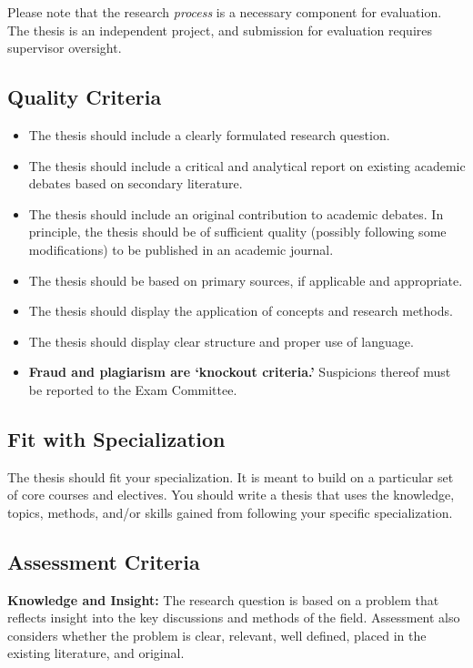 \documentclass[11pt,a4paper]{article}
\begin{document}
Please note that the research \textit{process} is a necessary component for evaluation. The thesis is an independent project, and submission for evaluation requires supervisor oversight.

\subsection{Quality Criteria}

\begin{itemize}
    \item The thesis should include a clearly formulated research question.
    \item The thesis should include a critical and analytical report on existing academic debates based on secondary literature.
    \item The thesis should include an original contribution to academic debates. In principle, the thesis should be of sufficient quality (possibly following some modifications) to be published in an academic journal.
    \item The thesis should be based on primary sources, if applicable and appropriate.
    \item The thesis should display the application of concepts and research methods.
    \item The thesis should display clear structure and proper use of language.
    \item \textbf{Fraud and plagiarism are `knockout criteria.'} Suspicions thereof must be reported to the Exam Committee.
\end{itemize}

\subsection{Fit with Specialization}

The thesis should fit your specialization. It is meant to build on a particular set of core courses and electives. You should write a thesis that uses the knowledge, topics, methods, and/or skills gained from following your specific specialization.

\subsection{Assessment Criteria}

\textbf{Knowledge and Insight:} The research question is based on a problem that reflects insight into the key discussions and methods of the field. Assessment also considers whether the problem is clear, relevant, well defined, placed in the existing literature, and original.
\end{document}
